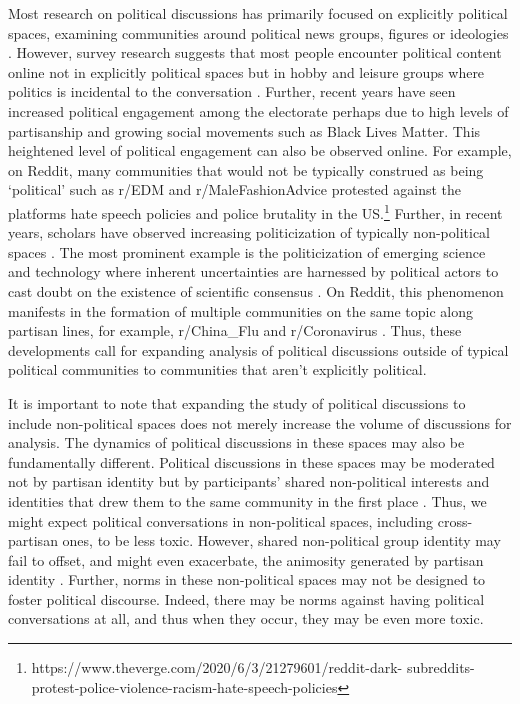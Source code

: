 \documentclass[letterpaper]{article} %
\begin{document}
Most research on political discussions has primarily focused on explicitly political spaces, examining communities around political news groups, figures or ideologies \cite{soliman2019characterization,himelboim2009discussion,an2019political}. However, survey research suggests that most people encounter political content online not in explicitly political spaces but in hobby and leisure groups where politics is incidental to the conversation \cite{wojcieszak2009online}. Further, recent years have seen increased political engagement among the electorate perhaps due to high levels of partisanship \cite{huddy2015expressive} and growing social movements \cite{bosi2016consequences} such as Black Lives Matter. This heightened level of political engagement can also be observed online. For example, on Reddit, many communities that would not be typically construed as being `political' such as r/EDM and r/MaleFashionAdvice protested against the platforms hate speech policies and police brutality in the US.\footnote{https://www.theverge.com/2020/6/3/21279601/reddit-dark- subreddits-protest-police-violence-racism-hate-speech-policies} Further, in recent years, scholars have observed increasing politicization of typically non-political spaces \cite{dagnes2019us}. The most prominent example is the politicization of emerging science and technology where inherent uncertainties are harnessed by political actors to cast doubt on the existence of scientific consensus \cite{bolsen2015counteracting}. On Reddit, this phenomenon manifests in the formation of multiple communities on the same topic along partisan lines, for example, r/China\_Flu and r/Coronavirus \cite{zhang2020tale}. Thus, these developments call for expanding analysis of political discussions outside of typical political communities to communities that aren't explicitly political.


It is important to note that expanding the study of political discussions to include non-political spaces does not merely increase the volume of discussions for analysis. The dynamics of political discussions in these spaces may also be fundamentally different. Political discussions in these spaces may be moderated not by partisan identity but by participants' shared non-political interests and identities that drew them to the same community in the first place \cite{gaertner2011common}. Thus, we might expect political conversations in non-political spaces, including cross-partisan ones, to be less toxic.
However,
shared non-political group identity may fail to offset, and might even exacerbate, the animosity generated by partisan identity \cite{klar2018common}. Further, norms in these non-political spaces may not be designed to foster political discourse. Indeed, there may be norms against having political conversations at all, and thus when they occur, they may be even more toxic.
\end{document}
